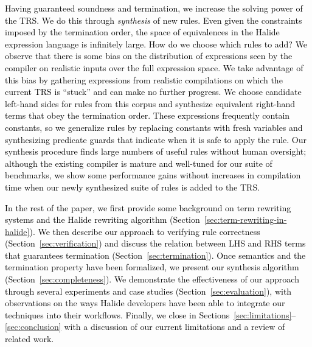 \documentclass[acmsmall,review]{acmart}\settopmatter{printfolios=true,printccs=false,printacmref=false}
\newcommand{\modified}[1]{\textcolor{black}{{#1}}}
\newcommand{\modifiedagain}[1]{\textcolor{black}{{#1}}}
\begin{document}
\modified{Having guaranteed soundness and termination, we increase 
the solving power of the TRS. We do this through \emph{synthesis} of new rules. Even
given the constraints imposed by the termination order, the space of equivalences 
in the Halide expression language is infinitely large. How do we choose which  
rules to add? We observe that there is some bias on the distribution of expressions 
seen by the compiler on realistic inputs over the full expression space. We take advantage 
of this bias by gathering expressions from realistic compilations on which the current 
TRS is ``stuck'' and can make no further progress. We choose candidate left-hand sides 
for rules from this corpus and synthesize equivalent right-hand terms that obey the 
termination order. \modifiedagain{These expressions frequently contain constants, so we
generalize rules by replacing constants
with fresh variables and synthesizing predicate guards that indicate when it is safe to apply 
the rule.} Our synthesis procedure finds large numbers of useful rules without
human oversight; although the existing compiler is mature 
and well-tuned for our suite of benchmarks, we show some performance 
gains without increases in compilation time when our newly synthesized suite 
of rules is added to the TRS. }


\modified{In the rest of the paper, we first provide some background on term rewriting systems 
and the Halide rewriting algorithm (Section~\ref{sec:term-rewriting-in-halide}).
We then describe our approach to verifying
rule correctness (Section~\ref{sec:verification}) and discuss the relation between LHS and RHS terms that guarantees 
termination (Section~\ref{sec:termination}). Once semantics and the termination property have been formalized, 
we present our synthesis algorithm (Section~\ref{sec:completeness}). We demonstrate the effectiveness of our approach 
through several experiments and case studies (Section~\ref{sec:evaluation}), with observations on the ways Halide developers 
have been able to integrate our techniques into their workflows. Finally, we close in Sections~\ref{sec:limitations}--\ref{sec:conclusion}
 with a discussion of our current limitations and a review of related work.}
\end{document}
